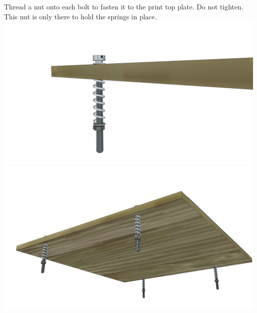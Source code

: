 \documentclass[twoside,openany,a4paper,titlepage]{memoir}
\begin{document}
	\section{}
	Thread a nut onto each bolt to fasten it to the print top plate. Do not tighten. This nut is only there to
	hold the springs in place.\\
	\includegraphics[width=1\linewidth]{graphics/ch11_5_1.png}
	\includegraphics[width=1\linewidth]{graphics/ch11_5_2.png}
	
\end{document}
